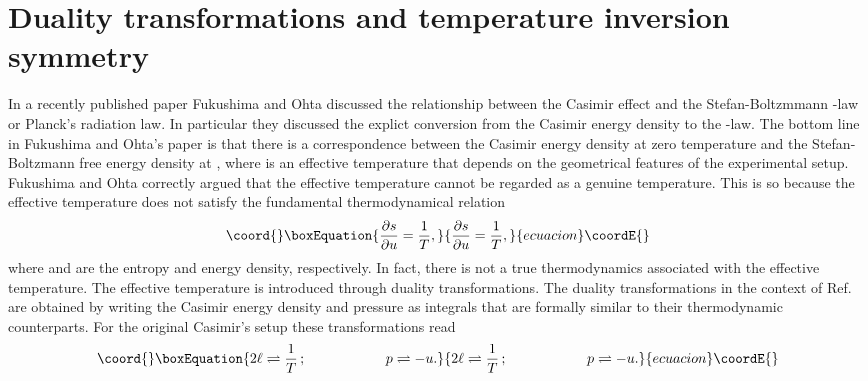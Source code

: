 \documentclass[a4paper,12pt]{article}
\begin{document}
\section{Duality transformations and temperature inversion \\ symmetry}
%
In a recently published paper Fukushima and Ohta  \cite{Fukushima&Ohta2001} discussed the relationship between the Casimir effect \cite{Casimir48} and the Stefan-Boltzmmann \coordHE{}-law or Planck's radiation law. In particular they discussed the explict conversion from the Casimir energy density to the \coordHE{}-law. The bottom line in Fukushima and Ohta's paper is that there is a correspondence between the Casimir energy density at zero temperature and the Stefan-Boltzmann free energy density at \coordHE{}, where \coordHE{} is an effective temperature that depends on the geometrical features of the experimental setup. Fukushima and Ohta correctly argued that the effective temperature cannot be regarded as a genuine temperature. This is so because the effective temperature does not satisfy the fundamental thermodynamical relation
%
\begin{equation}\coord{}\boxEquation{\label{trueT}
\frac{\partial s}{\partial u}=\frac{1}{T},
}{\frac{\partial s}{\partial u}=\frac{1}{T},
}{ecuacion}\coordE{}\end{equation}
%
where \coordHE{} and \coordHE{} are the entropy and energy density, respectively. In fact, there is not a true thermodynamics associated with the effective temperature. The effective temperature is introduced through duality transformations. The duality transformations in the context of Ref. \cite{Fukushima&Ohta2001} are obtained by writing the Casimir energy density and pressure as integrals that are formally similar to their thermodynamic counterparts. For the original Casimir's setup these transformations read 
%
\begin{equation}\coord{}\boxEquation{\label{dualCasimir}
2\ell \rightleftharpoons \frac{1}{T}\,; \hskip 2cm p\rightleftharpoons -u.
}{2\ell \rightleftharpoons \frac{1}{T}\,; \hskip 2cm p\rightleftharpoons -u.
}{ecuacion}\coordE{}\end{equation}
\end{document}
